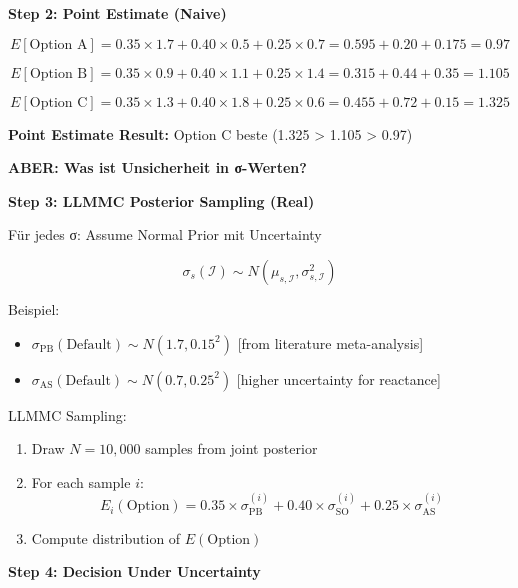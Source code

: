 \textbf{Step 2: Point Estimate (Naive)}

\begin{equation}
E[\text{Option A}] = 0.35 \times 1.7 + 0.40 \times 0.5 + 0.25 \times 0.7 = 0.595 + 0.20 + 0.175 = 0.97
\end{equation}

\begin{equation}
E[\text{Option B}] = 0.35 \times 0.9 + 0.40 \times 1.1 + 0.25 \times 1.4 = 0.315 + 0.44 + 0.35 = 1.105
\end{equation}

\begin{equation}
E[\text{Option C}] = 0.35 \times 1.3 + 0.40 \times 1.8 + 0.25 \times 0.6 = 0.455 + 0.72 + 0.15 = 1.325
\end{equation}

\textbf{Point Estimate Result:} Option C beste (1.325 > 1.105 > 0.97)

\textbf{ABER: Was ist Unsicherheit in σ-Werten?}

\textbf{Step 3: LLMMC Posterior Sampling (Real)}

Für jedes σ: Assume Normal Prior mit Uncertainty

\begin{equation}
\sigma_s(\mathcal{I}) \sim N(\mu_{s,\mathcal{I}}, \sigma^2_{s,\mathcal{I}})
\end{equation}

Beispiel:
\begin{itemize}[nosep]
\item $\sigma_{\text{PB}}(\text{Default}) \sim N(1.7, 0.15^2)$ [from literature meta-analysis]
\item $\sigma_{\text{AS}}(\text{Default}) \sim N(0.7, 0.25^2)$ [higher uncertainty for reactance]
\end{itemize}

LLMMC Sampling:
\begin{enumerate}
\item Draw $N=10,000$ samples from joint posterior
\item For each sample $i$:
  \begin{equation}
  E_i(\text{Option}) = 0.35 \times \sigma^{(i)}_{\text{PB}} + 0.40 \times \sigma^{(i)}_{\text{SO}} + 0.25 \times \sigma^{(i)}_{\text{AS}}
  \end{equation}
\item Compute distribution of $E(\text{Option})$
\end{enumerate}

\textbf{Step 4: Decision Under Uncertainty}

